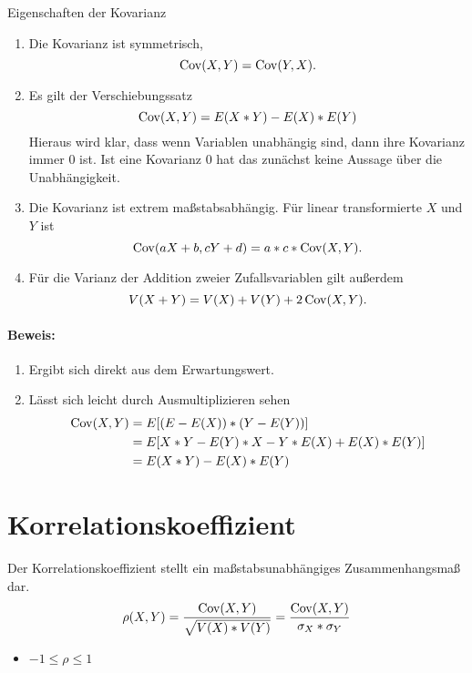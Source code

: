 \begin{satz}{Eigenschaften der Kovarianz}%
	\begin{enumerate}%
		\item Die Kovarianz ist symmetrisch, 
		\begin{equation*}
			\operatorname{Cov}(X,Y)=\operatorname{Cov}(Y,X).
		\end{equation*}
		\item Es gilt der Verschiebungssatz
		\begin{equation*}
			\operatorname{Cov}(X,Y)=E(X*Y)-E(X)*E(Y)
		\end{equation*}
		Hieraus wird klar, dass wenn Variablen unabhängig sind, dann ihre Kovarianz immer $0$ ist. Ist eine Kovarianz $0$ hat das zunächst keine Aussage über die Unabhängigkeit.
		\item Die Kovarianz ist extrem maßstabsabhängig. Für linear transformierte $X$ und $Y$ ist
		\begin{equation*}
			\operatorname{Cov}(aX+b,cY+d)=a*c*\operatorname{Cov}(X,Y).
		\end{equation*}
		\item Für die Varianz der Addition zweier Zufallsvariablen gilt außerdem
		\begin{equation*}
			V(X+Y)=V(X)+V(Y)+2\operatorname{Cov}(X,Y).
		\end{equation*}
	\end{enumerate}
\end{satz}
\paragraph{Beweis:}
\begin{enumerate}
	\item Ergibt sich direkt aus dem Erwartungswert.
	\item Lässt sich leicht durch Ausmultiplizieren sehen
	\begin{align*}%
		\cov(X,Y)&=E[(E-E(X))*(Y-E(Y))]\\
		&=E[X*Y-E(Y)*X-Y*E(X)+E(X)*E(Y)]\\
		&=E(X*Y)-E(X)*E(Y)
	\end{align*}
\end{enumerate}

\section{Korrelationskoeffizient}
Der Korrelationskoeffizient stellt ein maßstabsunabhängiges Zusammenhangsmaß dar.
\begin{equation*}
	\rho(X,Y)=\frac{\operatorname{Cov}(X,Y)}{\sqrt{V(X)*V(Y)}}=\frac{\operatorname{Cov}(X,Y)}{\sigma_X*\sigma_Y}
\end{equation*}
\begin{itemize}
	\item $-1\leq\rho\leq1$
\end{itemize}